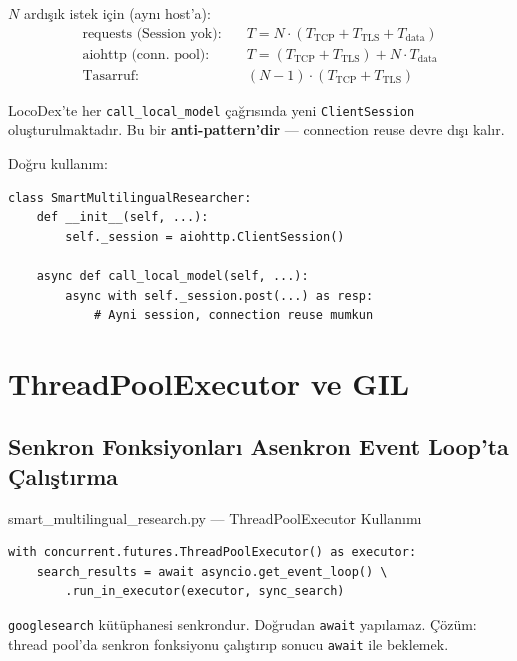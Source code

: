 $N$ ard{\i}\c{s}{\i}k istek i\c{c}in (ayn{\i} host'a):
\begin{align}
\text{requests (Session yok):} &\quad T = N \cdot (T_{\mathrm{TCP}} + T_{\mathrm{TLS}} + T_{\mathrm{data}}) \\
\text{aiohttp (conn. pool):}   &\quad T = (T_{\mathrm{TCP}} + T_{\mathrm{TLS}}) + N \cdot T_{\mathrm{data}} \\
\text{Tasarruf:}                &\quad (N-1) \cdot (T_{\mathrm{TCP}} + T_{\mathrm{TLS}})
\end{align}

\begin{dikkat}
LocoDex'te her \texttt{call\_local\_model} \c{c}a\u{g}r{\i}s{\i}nda yeni \texttt{ClientSession} olu\c{s}turulmaktad{\i}r. Bu bir \textbf{anti-pattern'dir} --- connection reuse devre d{\i}\c{s}{\i} kal{\i}r.

Do\u{g}ru kullan{\i}m:
\begin{lstlisting}
class SmartMultilingualResearcher:
    def __init__(self, ...):
        self._session = aiohttp.ClientSession()

    async def call_local_model(self, ...):
        async with self._session.post(...) as resp:
            # Ayni session, connection reuse mumkun
\end{lstlisting}
\end{dikkat}


\section{ThreadPoolExecutor ve GIL}
\label{sec:threadpool-gil}

\subsection{Senkron Fonksiyonlar{\i} Asenkron Event Loop'ta \c{C}al{\i}\c{s}t{\i}rma}
\label{sec:run-in-executor}

\begin{kodref}{smart\_multilingual\_research.py --- ThreadPoolExecutor Kullan{\i}m{\i}}
\begin{lstlisting}
with concurrent.futures.ThreadPoolExecutor() as executor:
    search_results = await asyncio.get_event_loop() \
        .run_in_executor(executor, sync_search)
\end{lstlisting}
\texttt{googlesearch} k\"{u}t\"{u}phanesi senkrondur. Do\u{g}rudan \texttt{await} yap{\i}lamaz. \c{C}\"{o}z\"{u}m: thread pool'da senkron fonksiyonu \c{c}al{\i}\c{s}t{\i}r{\i}p sonucu \texttt{await} ile beklemek.
\end{kodref}

